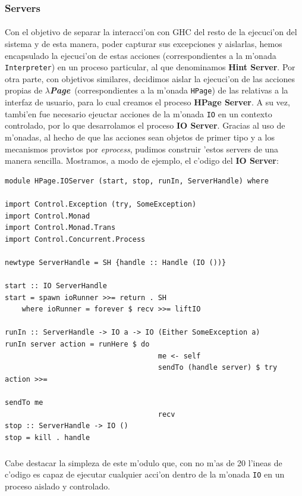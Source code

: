 \documentclass[a4paper]{article}
\newcommand{\hpage}{\textbf{\textsl{$\lambda$Page}}}
\begin{document}
\newpage
\subsubsection{Servers}
\paragraph{}Con el objetivo de separar la interacci'on con GHC del resto de la ejecuci'on del sistema y de esta manera, poder capturar sus excepciones y aislarlas, hemos encapsulado la ejecuci'on de estas acciones (correspondientes a la m'onada \texttt{Interpreter}) en un proceso particular, al que denominamos \textbf{Hint Server}.  Por otra parte, con objetivos similares, decidimos aislar la ejecuci'on de las acciones propias de \hpage\ (correspondientes a la m'onada \texttt{HPage}) de las relativas a la interfaz de usuario, para lo cual creamos el proceso \textbf{HPage Server}.  A su vez, tambi'en fue necesario ejeuctar acciones de la m'onada \texttt{IO} en un contexto controlado, por lo que desarrolamos el proceso \textbf{IO Server}.  Gracias al uso de m'onadas, al hecho de que las acciones sean objetos de primer tipo y a los mecanismos provistos por \textsl{eprocess}, pudimos construir 'estos servers de una manera sencilla.   Mostramos, a modo de ejemplo, el c'odigo del \textbf{IO Server}:
\begin{center}\begin{lstlisting}
module HPage.IOServer (start, stop, runIn, ServerHandle) where

import Control.Exception (try, SomeException)
import Control.Monad
import Control.Monad.Trans
import Control.Concurrent.Process

newtype ServerHandle = SH {handle :: Handle (IO ())}

start :: IO ServerHandle
start = spawn ioRunner >>= return . SH
    where ioRunner = forever $ recv >>= liftIO

runIn :: ServerHandle -> IO a -> IO (Either SomeException a)
runIn server action = runHere $ do
                                    me <- self
                                    sendTo (handle server) $ try action >>=
                                                                    sendTo me
                                    recv
stop :: ServerHandle -> IO ()
stop = kill . handle
\end{lstlisting}\end{center}
\subparagraph{}Cabe destacar la simpleza de este m'odulo que, con no m'as de 20 l'ineas de c'odigo es capaz de ejecutar cualquier acci'on dentro de la m'onada \texttt{IO} en un proceso aislado y controlado.
\end{document}
